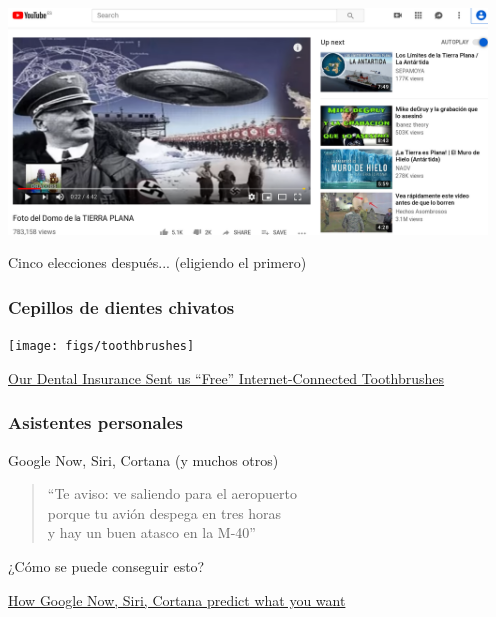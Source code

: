\documentclass[17pt,aspectratio=169]{beamer}
\begin{document}

\begin{frame}

\begin{center}
\includegraphics[height=6cm]{figs/tierra-plana}
\end{center}

Cinco elecciones después... (eligiendo el primero)
\end{frame}



\begin{frame}
\frametitle{Cepillos de dientes chivatos}

\begin{center}
\texttt{[image: figs/toothbrushes]}
\end{center}
\begin{flushright}
{\tiny \href{https://wolfstreet.com/2018/04/14/our-dental-insurance-sent-us-free-internet-connected-toothbrushes-and-this-is-what-happened-next/}{Our Dental Insurance Sent us “Free” Internet-Connected Toothbrushes}}
\end{flushright}

\end{frame}


\begin{frame}
\frametitle{Asistentes personales}

\begin{flushright}
  Google Now, Siri, Cortana (y muchos otros)
\end{flushright}

\begin{quote}
  ``Te aviso:
  ve saliendo para el aeropuerto \\
  porque tu avión despega en tres horas \\
  y hay un buen atasco en la M-40'' \\
\end{quote}

¿Cómo se puede conseguir esto?

\begin{flushright}
  {\tiny \href{http://searchengineland.com/how-google-now-siri-cortana-predict-what-you-want-229799}{How Google Now, Siri, Cortana predict what you want}}
\end{flushright}
\end{frame}
\end{document}
